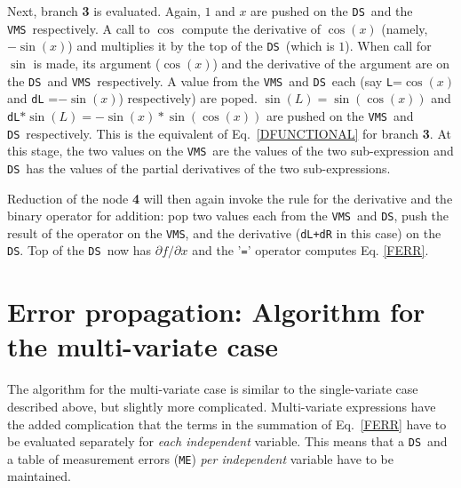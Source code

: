 \documentclass[12pt]{article}
\newcommand{\DS}{{\tt DS}}
\newcommand{\VMS}{{\tt VMS}}
\begin{document}
Next, branch {\bf 3} is evaluated.  Again, $1$ and $x$ are pushed on
the \DS\ and the \VMS\ respectively.  A call to $\cos$ compute the
derivative of $\cos(x)$ (namely, $-\sin(x)$) and multiplies it by the
top of the \DS\ (which is $1$).  When call for $\sin$ is made, its
argument ($\cos(x)$) and the derivative of the argument are on the
\DS\ and \VMS\ respectively. A value from the \VMS\ and \DS\ each (say
{\tt L}=$\cos(x)$ and {\tt dL} =$-\sin(x)$) respectively) are poped.
$\sin(L)=\sin(\cos(x))$ and {\tt dL}$*\sin(L)=-\sin(x)*\sin(\cos(x))$
are pushed on the \VMS\ and \DS\ respectively.  This is the equivalent
of Eq.~\ref{DFUNCTIONAL} for branch {\bf 3}.  At this stage, the two
values on the \VMS\ are the values of the two sub-expression and \DS\
has the values of the partial derivatives of the two sub-expressions.

Reduction of the node {\bf 4} will then again invoke the rule for the
derivative and the binary operator for addition: pop two values each
from the \VMS\ and \DS, push the result of the operator on the \VMS,
and the derivative ({\tt dL+dR} in this case) on the \DS.  Top of the
\DS\ now has $\partial f / \partial x$ and the '{\tt=}' operator
computes Eq. \ref{FERR}.

\section{Error propagation: Algorithm for the multi-variate case}
\label{SEC:MULTI_VAR}

The algorithm for the multi-variate case is similar to the
single-variate case described above, but slightly more complicated.
Multi-variate expressions have the added complication that the terms
in the summation of Eq.~\ref{FERR} have to be evaluated separately for
{\it each independent} variable.  This means that a \DS\ and a table
of measurement errors ({\tt ME}) {\it per independent} variable have
to be maintained.
\end{document}
